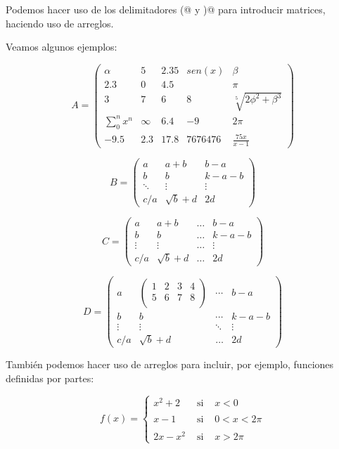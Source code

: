 \documentclass[letterpaper,12pt]{book}
\begin{document}
Podemos hacer uso de los delimitadores \verb@\left(@ y \verb@\right)@ para introducir matrices, haciendo uso
de arreglos. 

Veamos algunos ejemplos:

\[
A = \left( 
\begin{array}{ccccc}
	\alpha & 5 & 2.35 & sen(x) & \beta \\
	2.3 & 0 & 4.5 & & \pi \\
	3 & 7 & 6 & 8 & \sqrt[5]{2 \phi^2 + \beta^3} \\
	\displaystyle\sum_{0}^{n} x^n & \infty & 6.4 & -9 & 2 \pi \\
	-9.5 & 2.3 & 17.8 & 7676476 & \frac{75 x}{x-1}
\end{array}
\right)
\]

\[
B = \left( 
\begin{array}{lcc}
	a & a+b & b-a \\
	b & b & k-a-b \\
	\ddots & \vdots & \vdots \\
	c/a & \sqrt{b} + d & 2d
\end{array}
\right)
\]

\[
C = \left( 
\begin{array}{lccc}
	a & a+b & \hdots & b-a \\
	b & b & \hdots & k-a-b \\
	\vdots & \vdots & \hdots & \vdots \\
	c/a & \sqrt{b} + d & \hdots & 2d
\end{array}
\right)
\]

\[
D = \left( 
\begin{array}{lccc}
	a & \left(\begin{array}{cccc}
	1 & 2 & 3 & 4 \\
	5 & 6 & 7 & 8 \\	
\end{array} \right) & \cdots & b-a \\
	b & b & \cdots & k-a-b \\
	\vdots & \vdots & \ddots & \vdots \\
	c/a & \sqrt{b} + d & \hdots & 2d
\end{array}
\right)
\]

También podemos hacer uso de arreglos para incluir, por ejemplo, funciones definidas por partes:

\[
f(x)= \left\{ 
\begin{array}{lcl}
	x^2 + 2 & \mbox{ si } & x<0 \\
	& & \\
	x-1 & \mbox{ si } & 0 < x < 2 \pi \\
	& & \\
	2 x - x^2 & \mbox{ si } & x>2 \pi
\end{array}
\right.
\]
\end{document}

